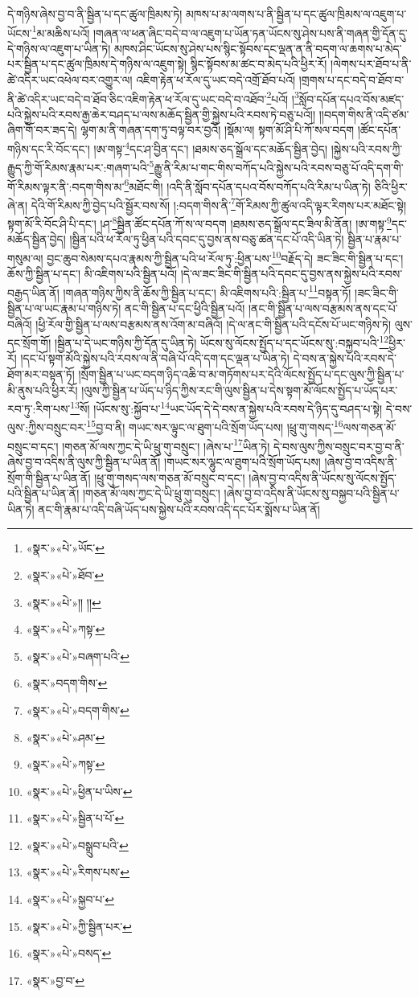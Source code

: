 དེ་གཉིས་ཞེས་བྱ་བ་ནི་སྦྱིན་པ་དང་ཚུལ་ཁྲིམས་ཏེ། མཁས་པ་མ་ལགས་པ་ནི་སྦྱིན་པ་དང་ཚུལ་ཁྲིམས་ལ་འཇུག་པ་ཡོངས་\footnote{«སྣར་»«པེ་»ཡོང་}མ་མཆིས་པའོ། །གཞན་ལ་ཕན་ཞིང་བདེ་བ་ལ་འཇུག་པ་ཡོན་ཏན་ཡོངས་སུ་ཤེས་པས་ནི་གཞན་གྱི་དོན་དུ་དེ་གཉིས་ལ་འཇུག་པ་ཡིན་ཏེ། མཁས་ཤིང་ཡོངས་སུ་ཤེས་པས་སྙིང་སྟོབས་དང་ལྡན་ན་ནི་བདག་ལ་ཆགས་པ་མེད་པར་སྦྱིན་པ་དང་ཚུལ་ཁྲིམས་དེ་གཉིས་ལ་འཇུག་སྟེ། སྙིང་སྟོབས་མ་ཚང་བ་མེད་པའི་ཕྱིར་རོ། །ལེགས་པར་ཐོབ་པ་ནི་ཚེ་འདིར་ཡང་འཕེལ་བར་འགྱུར་ལ། འཇིག་རྟེན་ཕ་རོལ་དུ་ཡང་བདེ་འགྲོ་ཐོབ་པའོ། །གྲགས་པ་དང་བདེ་བ་ཐོབ་བ་ནི་ཚེ་འདིར་ཡང་བདེ་བ་ཐོབ་ཅིང་འཇིག་རྟེན་ཕ་རོལ་དུ་ཡང་བདེ་བ་འཐོབ་\footnote{«སྣར་»«པེ་»ཐོབ་}པའོ། །\footnote{«སྣར་»«པེ་»།། །།}སློབ་དཔོན་དཔའ་བོས་མཛད་པའི་སྐྱེས་པའི་རབས་རྒྱ་ཆེར་བཤད་པ་ལས་མཆོད་སྦྱིན་གྱི་སྐྱེས་པའི་རབས་ཏེ་བཅུ་པའོ།། །།བདག་གིས་ནི་འདི་ཙམ་ཞིག་གོ་བར་ཟད་དེ། ལྷག་མ་ནི་གཞན་དག་ཏུ་བལྟ་བར་བྱའོ། །སྡོམ་ལ། སྟག་མོ་ཤི་པི་ཀོ་སལ་བདག །ཚོང་དཔོན་གཉིས་དང་རི་བོང་དང་། །ཨ་གསྟ་\footnote{«སྣར་»«པེ་»ཀསྟ་}དང་ཤ་བྱིན་དང་། །ཐམས་ཅད་སྒྲོལ་དང་མཆོད་སྦྱིན་བྱེད། །སྐྱེས་པའི་རབས་ཀྱི་རྒྱུད་ཀྱི་གོ་རིམས་རྣམ་པར་:གཞག་པའི་\footnote{«སྣར་»«པེ་»བཞག་པའི་}རྒྱུ་ནི་རིམ་པ་གང་གིས་བཀོད་པའི་སྐྱེས་པའི་རབས་བཅུ་པོ་འདི་དག་གི་གོ་རིམས་ལྟར་ནི་:བདག་གིས་མ་\footnote{«སྣར་»བདག་གིས་}མཐོང་གི། །འདི་ནི་སློབ་དཔོན་དཔའ་བོས་བཀོད་པའི་རིམ་པ་ཡིན་ཏེ། ཅིའི་ཕྱིར་ཞེ་ན། དེའི་གོ་རིམས་ཀྱི་བྱེད་པའི་སྦྱོར་བས་སོ། །:བདག་གིས་ནི་\footnote{«སྣར་»«པེ་»བདག་གིས་}གོ་རིམས་ཀྱི་ཚུལ་འདི་ལྟར་རིགས་པར་མཐོང་སྟེ། སྟག་མོ་རི་བོང་ཤི་པི་དང་། །ཤ་\footnote{«སྣར་»«པེ་»ཤམ་}སྦྱིན་ཚོང་དཔོན་ཀོ་ས་ལ་བདག །ཐམས་ཅད་སྒྲོལ་དང་ཟིལ་མི་ནོན། །ཨ་གསྟ་\footnote{«སྣར་»«པེ་»ཀསྟ་}དང་མཆོད་སྦྱིན་བྱེད། །སྦྱིན་པའི་ཕ་རོལ་ཏུ་ཕྱིན་པའི་དབང་དུ་བྱས་ནས་བཅུ་ཚན་དང་པོ་འདི་ཡིན་ཏེ། སྦྱིན་པ་རྣམ་པ་གསུམ་ལ། བྱང་ཆུབ་སེམས་དཔའ་རྣམས་ཀྱི་སྦྱིན་པའི་ཕ་རོལ་ཏུ་:ཕྱིན་པས་\footnote{«སྣར་»«པེ་»ཕྱིན་པ་ཡིས་}བརྗོད་དེ། ཟང་ཟིང་གི་སྦྱིན་པ་དང་། ཆོས་ཀྱི་སྦྱིན་པ་དང་། མི་འཇིགས་པའི་སྦྱིན་པའོ། །དེ་ལ་ཟང་ཟིང་གི་སྦྱིན་པའི་དབང་དུ་བྱས་ནས་སྐྱེས་པའི་རབས་བརྒྱད་ཡིན་ནོ། །གཞན་གཉིས་ཀྱིས་ནི་ཆོས་ཀྱི་སྦྱིན་པ་དང་། མི་འཇིགས་པའི་:སྦྱིན་པ་\footnote{«སྣར་»«པེ་»སྦྱིན་པ་པོ་}བསྟན་ཏོ། །ཟང་ཟིང་གི་སྦྱིན་པ་ལ་ཡང་རྣམ་པ་གཉིས་ཏེ། ནང་གི་སྦྱིན་པ་དང་ཕྱིའི་སྦྱིན་པའོ། །ནང་གི་སྦྱིན་པ་ལས་བརྩམས་ནས་དང་པོ་བཞིའོ། །ཕྱི་རོལ་གྱི་སྦྱིན་པ་ལས་བརྩམས་ནས་འོག་མ་བཞིའོ། །དེ་ལ་ནང་གི་སྦྱིན་པའི་དངོས་པོ་ཡང་གཉིས་ཏེ། ལུས་དང་སྲོག་གོ། །སྦྱིན་པ་དེ་ཡང་གཉིས་ཀྱི་དོན་དུ་ཡིན་ཏེ། ཡོངས་སུ་ལོངས་སྤྱོད་པ་དང་ཡོངས་སུ་:བསྐྱབ་པའི་\footnote{«སྣར་»«པེ་»བསྒྲུབ་པའི་}ཕྱིར་རོ། །དང་པོ་སྟག་མོའི་སྐྱེས་པའི་རབས་ལ་ནི་བཞི་པོ་འདི་དག་དང་ལྡན་པ་ཡིན་ཏེ། དེ་བས་ན་སྐྱེས་པའི་རབས་དེ་ཐོག་མར་བསྟན་ཏོ། །སྲོག་སྦྱིན་པ་ཡང་བདག་ཉིད་འཆི་བ་མ་གཏོགས་པར་དེའི་ལོངས་སྤྱོད་པ་དང་ལུས་ཀྱི་སྦྱིན་པ་མི་ནུས་པའི་ཕྱིར་རོ། །ལུས་ཀྱི་སྦྱིན་པ་ཡོད་པ་ཉིད་ཀྱིས་རང་གི་ལུས་སྦྱིན་པ་དེས་སྟག་མོ་ལོངས་སྤྱོད་པ་ཡོད་པར་རབ་ཏུ་:རིག་པས་\footnote{«སྣར་»«པེ་»རིགས་པས་}སོ། །ཡོངས་སུ་:སྐྱོབ་པ་\footnote{«སྣར་»«པེ་»སྐྱབ་པ་}ཡང་ཡོད་དེ་དེ་བས་ན་སྐྱེས་པའི་རབས་དེ་ཉིད་དུ་བཤད་པ་སྟེ། དེ་བས་ལུས་:ཀྱིས་བསྲུང་བར་\footnote{«སྣར་»«པེ་»ཀྱི་སྦྱིན་པར་}བྱ་བ་ནི། གཡང་སར་ལྟུང་ལ་ཐུག་པའི་སྲོག་ཡོད་པས། །ཕྲུ་གུ་གསད་\footnote{«སྣར་»«པེ་»བསད་}ལས་གཅན་མོ་བསྲུང་བ་དང་། །གཅན་མོ་ལས་ཀྱང་དེ་ཡི་ཕྲུ་གུ་བསྲུང་། །ཞེས་པ་\footnote{«སྣར་»བྱ་བ་}ཡིན་ཏེ། དེ་བས་ལུས་ཀྱིས་བསྲུང་བར་བྱ་བ་ནི་ཞེས་བྱ་བ་འདིས་ནི་ལུས་ཀྱི་སྦྱིན་པ་ཡིན་ནོ། །གཡང་སར་ལྷུང་ལ་ཐུག་པའི་སྲོག་ཡོད་པས། །ཞེས་བྱ་བ་འདིས་ནི་སྲོག་གི་སྦྱིན་པ་ཡིན་ནོ། །ཕྲུ་གུ་གསད་ལས་གཅན་མོ་བསྲུང་བ་དང་། །ཞེས་བྱ་བ་འདིས་ནི་ཡོངས་སུ་ལོངས་སྤྱོད་པའི་སྦྱིན་པ་ཡིན་ནོ། །གཅན་མོ་ལས་ཀྱང་དེ་ཡི་ཕྲུ་གུ་བསྲུང་། །ཞེས་བྱ་བ་འདིས་ནི་ཡོངས་སུ་བསྐྱབ་པའི་སྦྱིན་པ་ཡིན་ཏེ། ནང་གི་རྣམ་པ་འདི་བཞི་ཡོད་པས་སྐྱེས་པའི་རབས་འདི་དང་པོར་སྨོས་པ་ཡིན་ནོ། 